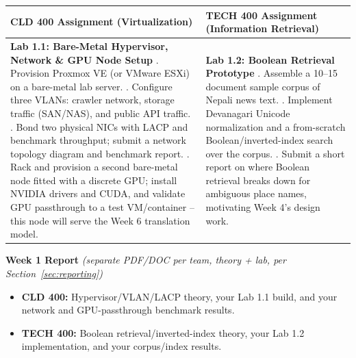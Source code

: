 \documentclass[10pt, a4paper]{article}
\newcommand{\weeklyreport}[3]{%
  \par\vspace{0.4em}
  \noindent\colorbox{lightgray!35}{\parbox{\dimexpr\textwidth-2\fboxsep\relax}{%
    \textbf{\color{primary}#1 Report} \textit{(separate PDF/DOC per team, theory + lab, per Section~\ref{sec:reporting})}
    \begin{itemize}
        \item \textbf{CLD 400:} #2
        \item \textbf{TECH 400:} #3
    \end{itemize}
  }}%
  \par\vspace{0.3em}
}
\begin{document}
\begin{table}[H]
\centering
\small
\renewcommand{\arraystretch}{1.2}
\begin{tabularx}{\textwidth}{|X|X|}
\hline
\rowcolor{lightgray}
\textbf{CLD 400 Assignment (Virtualization)} & \textbf{TECH 400 Assignment (Information Retrieval)} \\ \hline
\textbf{Lab 1.1: Bare-Metal Hypervisor, Network \& GPU Node Setup} \newline
1. Provision Proxmox VE (or VMware ESXi) on a bare-metal lab server. \newline
2. Configure three VLANs: crawler network, storage traffic (SAN/NAS), and public API traffic. \newline
3. Bond two physical NICs with LACP and benchmark throughput; submit a network topology diagram and benchmark report. \newline
4. Rack and provision a second bare-metal node fitted with a discrete GPU; install NVIDIA drivers and CUDA, and validate GPU passthrough to a test VM/container -- this node will serve the Week 6 translation model. & \textbf{Lab 1.2: Boolean Retrieval Prototype} \newline
1. Assemble a 10--15 document sample corpus of Nepali news text. \newline
2. Implement Devanagari Unicode normalization and a from-scratch Boolean/inverted-index search over the corpus. \newline
3. Submit a short report on where Boolean retrieval breaks down for ambiguous place names, motivating Week 4's design work. \\ \hline
\end{tabularx}
\end{table}

\weeklyreport{Week 1}{Hypervisor/VLAN/LACP theory, your Lab 1.1 build, and your network and GPU-passthrough benchmark results.}{Boolean retrieval/inverted-index theory, your Lab 1.2 implementation, and your corpus/index results.}
\end{document}
